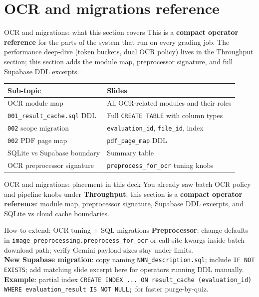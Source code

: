 \documentclass[aspectratio=169]{beamer}
\begin{document}
\section{OCR and migrations reference}

\begin{frame}{OCR and migrations: what this section covers}
  \small
  This is a \textbf{compact operator reference} for the parts of the system that run on every grading job.
  The performance deep-dive (token buckets, dual OCR policy) lives in the Throughput section;
  this section adds the module map, preprocessor signature, and full Supabase DDL excerpts.\\[0.4em]
  \begin{tabular}{@{}p{3.5cm}p{10.2cm}@{}}
    \toprule
    Sub-topic & Slides \\
    \midrule
    OCR module map & All OCR-related modules and their roles \\
    \texttt{001\_result\_cache.sql} DDL & Full \texttt{CREATE TABLE} with column types \\
    \texttt{002} scope migration & \texttt{evaluation\_id}, \texttt{file\_id}, index \\
    \texttt{002} PDF page map & \texttt{pdf\_page\_map} DDL \\
    SQLite vs Supabase boundary & Summary table \\
    OCR preprocessor signature & \texttt{preprocess\_for\_ocr} tuning knobs \\
    \bottomrule
  \end{tabular}
\end{frame}

\begin{frame}{OCR and migrations: placement in this deck}
  \small
  You already saw batch OCR policy and pipeline knobs under \textbf{Throughput}; this section is a \textbf{compact operator reference}: module map, preprocessor signature, Supabase DDL excerpts, and SQLite vs cloud cache boundaries.
\end{frame}

\begin{frame}{How to extend: OCR tuning + SQL migrations}
  \small
  \textbf{Preprocessor}: change defaults in \texttt{image\_preprocessing.preprocess\_for\_ocr} or call-site kwargs inside batch download path; verify Gemini payload sizes stay under limits.\\
  \textbf{New Supabase migration}: copy naming \texttt{NNN\_description.sql}; include \texttt{IF NOT EXISTS}; add matching slide excerpt here for operators running DDL manually.\\
  \textbf{Example}: partial index \texttt{CREATE INDEX ... ON result\_cache (evaluation\_id) WHERE evaluation\_result IS NOT NULL;} for faster purge-by-quiz.
\end{frame}
\end{document}
